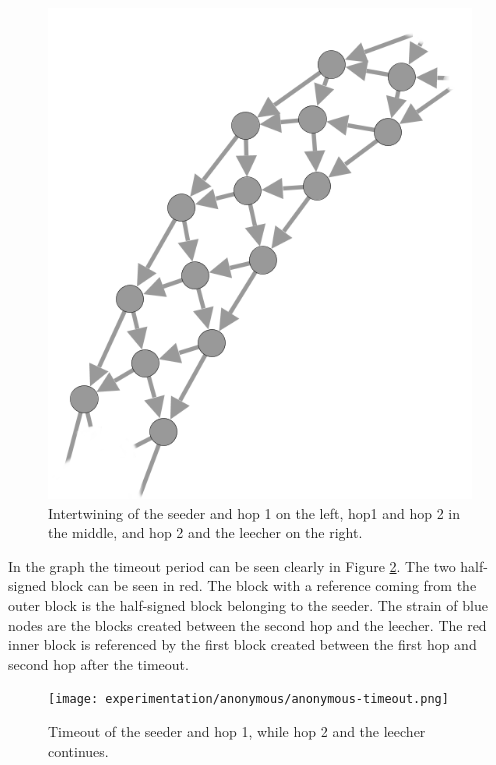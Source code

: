 \begin{figure}
	\centerline{\includegraphics[scale=0.5]{experimentation/anonymous/anonymous-magnified.png}}
	\caption{Intertwining of the seeder and hop 1 on the left, hop1 and hop 2 in the middle, and hop 2 and the leecher on the right.}
	\label{fig:synthetic-anonymous-graph-magnified}
\end{figure}

In the graph the timeout period can be seen clearly in Figure \ref{fig:synthetic-anonymous-timeout}.
The two half-signed block can be seen in red.
The block with a reference coming from the outer block is the half-signed block belonging to the seeder.
The strain of blue nodes are the blocks created between the second hop and the leecher.
The red inner block is referenced by the first block created between the first hop and second hop after the timeout.

\begin{figure}
	\centerline{\texttt{[image: experimentation/anonymous/anonymous-timeout.png]}}
	\caption{Timeout of the seeder and hop 1, while hop 2 and the leecher continues.}
	\label{fig:synthetic-anonymous-timeout}
\end{figure}
